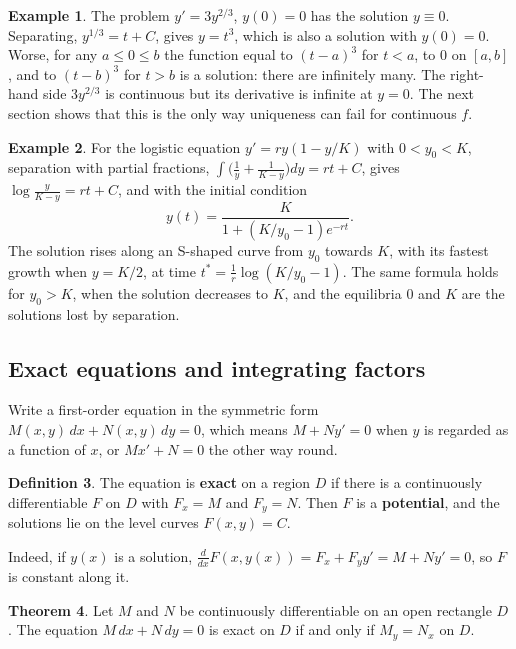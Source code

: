 \documentclass[11pt,a4paper]{article}
\numberwithin{equation}{section}
\theoremstyle{definition}
\newtheorem{thm}{Theorem}[subsection]
\newtheorem{defn}[thm]{Definition}
\newtheorem{exa}[thm]{Example}
\begin{document}
\begin{exa}
\label{ex:nonunique}
The problem $y' = 3y^{2/3}$, $y(0) = 0$ has the solution $y \equiv 0$. Separating, $y^{1/3} = t + C$, gives $y = t^3$, which is also a solution with $y(0) = 0$. Worse, for any $a \leq 0 \leq b$
the function equal to $(t - a)^3$ for $t < a$, to $0$ on $[a, b]$, and to $(t - b)^3$ for $t > b$ is a solution: there are infinitely many. The right-hand side $3y^{2/3}$ is continuous but its
derivative is infinite at $y = 0$. The next section shows that this is the only way uniqueness can fail for continuous $f$.
\end{exa}

\begin{exa}
\label{ex:logistic}
For the logistic equation $y' = ry(1 - y/K)$ with $0 < y_0 < K$, separation with partial fractions, $\int\bigl(\frac1y + \frac{1}{K - y}\bigr)dy = rt + C$, gives $\log\frac{y}{K - y} = rt + C$,
and with the initial condition
\[
y(t) = \frac{K}{1 + (K/y_0 - 1)e^{-rt}} .
\]
The solution rises along an S-shaped curve from $y_0$ towards $K$, with its fastest growth when $y = K/2$, at time $t^* = \frac1r\log(K/y_0 - 1)$. The same formula holds
for $y_0 > K$, when the solution decreases to $K$, and the equilibria $0$ and $K$ are the solutions lost by separation.
\end{exa}

\subsection{Exact equations and integrating factors}
\label{ssec:exact}

Write a first-order equation in the symmetric form $M(x, y)\,dx + N(x, y)\,dy = 0$, which means $M + Ny' = 0$ when $y$ is regarded as a function of $x$, or $Mx' + N = 0$ the other way
round.

\begin{defn}
The equation is \textbf{exact} on a region $D$ if there is a continuously differentiable $F$ on $D$ with $F_x = M$ and $F_y = N$. Then $F$ is a \textbf{potential}, and the
solutions lie on the level curves $F(x, y) = C$.
\end{defn}

Indeed, if $y(x)$ is a solution, $\frac{d}{dx}F(x, y(x)) = F_x + F_yy' = M + Ny' = 0$, so $F$ is constant along it.

\begin{thm}
\label{thm:exact}
Let $M$ and $N$ be continuously differentiable on an open rectangle $D$. The equation $M\,dx + N\,dy = 0$ is exact on $D$ if and only if $M_y = N_x$ on $D$.
\end{thm}
\end{document}
